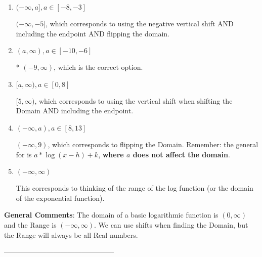 \documentclass{extbook}[14pt]
\begin{document}
\begin{enumerate}[label=\Alph*.] 
\item $ (-\infty, a], a \in [-8, -3] $ 

 $(-\infty, -5]$, which corresponds to using the negative vertical shift AND including the endpoint AND flipping the domain. 
\item $ (a, \infty), a \in [-10, -6] $ 

 * $(-9, \infty)$, which is the correct option. 
\item $ [a, \infty), a \in [0, 8] $ 

 $[5, \infty)$, which corresponds to using the vertical shift when shifting the Domain AND including the endpoint. 
\item $ (-\infty, a), a \in [8, 13] $ 

 $(-\infty, 9)$, which corresponds to flipping the Domain. Remember: the general for is $a*\log(x-h)+k$, \textbf{where $a$ does not affect the domain}. 
\item $ (-\infty, \infty) $ 

 This corresponds to thinking of the range of the log function (or the domain of the exponential function). 
\end{enumerate} 
 
\textbf{General Comments}: The domain of a basic logarithmic function is $(0, \infty)$ and the Range is $(-\infty, \infty)$. We can use shifts when finding the Domain, but the Range will always be all Real numbers.

-----------------------------------------------
\end{document}
